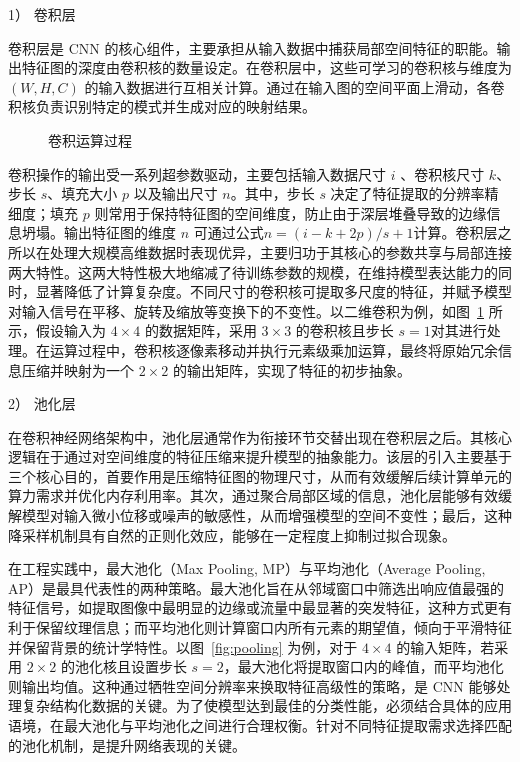 1） 卷积层

卷积层是 CNN 的核心组件，主要承担从输入数据中捕获局部空间特征的职能。输出特征图的深度由卷积核的数量设定。在卷积层中，这些可学习的卷积核与维度为 $(W, H, C)$ 的输入数据进行互相关计算。通过在输入图的空间平面上滑动，各卷积核负责识别特定的模式并生成对应的映射结果。

\begin{figure}[ht]
  \centering
  \caption{卷积运算过程}
  \label{fig:2dcnn}
\end{figure}

卷积操作的输出受一系列超参数驱动，主要包括输入数据尺寸 $i$ 、卷积核尺寸 $k$、步长 $s$、填充大小 $p$ 以及输出尺寸 $n$。其中，步长 $s$ 决定了特征提取的分辨率精细度；填充 $p$ 则常用于保持特征图的空间维度，防止由于深层堆叠导致的边缘信息坍塌。输出特征图的维度 $n$ 可通过公式$n = (i - k + 2p)/s + 1$计算。卷积层之所以在处理大规模高维数据时表现优异，主要归功于其核心的参数共享与局部连接两大特性。这两大特性极大地缩减了待训练参数的规模，在维持模型表达能力的同时，显著降低了计算复杂度。不同尺寸的卷积核可提取多尺度的特征，并赋予模型对输入信号在平移、旋转及缩放等变换下的不变性。以二维卷积为例，如图~\ref{fig:2dcnn} 所示，假设输入为 $4 \times 4$ 的数据矩阵，采用 $3 \times 3$ 的卷积核且步长 $s=1$对其进行处理。在运算过程中，卷积核逐像素移动并执行元素级乘加运算，最终将原始冗余信息压缩并映射为一个 $2 \times 2$ 的输出矩阵，实现了特征的初步抽象。

2） 池化层

在卷积神经网络架构中，池化层通常作为衔接环节交替出现在卷积层之后。其核心逻辑在于通过对空间维度的特征压缩来提升模型的抽象能力。该层的引入主要基于三个核心目的，首要作用是压缩特征图的物理尺寸，从而有效缓解后续计算单元的算力需求并优化内存利用率。其次，通过聚合局部区域的信息，池化层能够有效缓解模型对输入微小位移或噪声的敏感性，从而增强模型的空间不变性；最后，这种降采样机制具有自然的正则化效应，能够在一定程度上抑制过拟合现象。

在工程实践中，最大池化（Max Pooling, MP）与平均池化（Average Pooling, AP）是最具代表性的两种策略。最大池化旨在从邻域窗口中筛选出响应值最强的特征信号，如提取图像中最明显的边缘或流量中最显著的突发特征，这种方式更有利于保留纹理信息；而平均池化则计算窗口内所有元素的期望值，倾向于平滑特征并保留背景的统计学特性。以图~\ref{fig:pooling} 为例，对于 $4 \times 4$ 的输入矩阵，若采用 $2 \times 2$ 的池化核且设置步长 $s=2$，最大池化将提取窗口内的峰值，而平均池化则输出均值。这种通过牺牲空间分辨率来换取特征高级性的策略，是 CNN 能够处理复杂结构化数据的关键。为了使模型达到最佳的分类性能，必须结合具体的应用语境，在最大池化与平均池化之间进行合理权衡。针对不同特征提取需求选择匹配的池化机制，是提升网络表现的关键。

